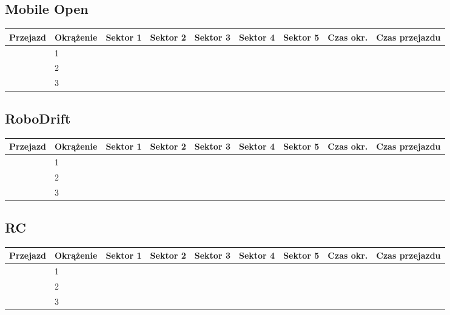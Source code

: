 \documentclass[11pt]{article}
\begin{document}
\subsection{Mobile Open}
\begin{table}[h]
\begin{tabular}{|l|l|l|l|l|l|l|l|l|}
\hline
   Przejazd        & Okrążenie & Sektor 1 & Sektor 2 & Sektor 3 & Sektor 4 & Sektor 5 & Czas okr. & Czas przejazdu    \\ \hline
\multirow{3}{*}{} & 1         &          &          &          &          &          &           & \multirow{3}{*}{} \\ \cline{2-8}
                   & 2         &          &          &          &          &          &           &                  \\ \cline{2-8}
                   & 3         &          &          &          &          &          &           &                   \\ \hline
\end{tabular}
\end{table}
\subsection{RoboDrift}
\begin{table}[h]
\begin{tabular}{|l|l|l|l|l|l|l|l|l|}
\hline
   Przejazd        & Okrążenie & Sektor 1 & Sektor 2 & Sektor 3 & Sektor 4 & Sektor 5 & Czas okr. & Czas przejazdu    \\ \hline
\multirow{3}{*}{} & 1         &          &          &          &          &          &           & \multirow{3}{*}{} \\ \cline{2-8}
                   & 2         &          &          &          &          &          &           &                  \\ \cline{2-8}
                   & 3         &          &          &          &          &          &           &                   \\ \hline
\end{tabular}
\end{table}
\subsection{RC}
\begin{table}[h]
\begin{tabular}{|l|l|l|l|l|l|l|l|l|}
\hline
   Przejazd        & Okrążenie & Sektor 1 & Sektor 2 & Sektor 3 & Sektor 4 & Sektor 5 & Czas okr. & Czas przejazdu    \\ \hline
\multirow{3}{*}{} & 1         &          &          &          &          &          &           & \multirow{3}{*}{} \\ \cline{2-8}
                   & 2         &          &          &          &          &          &           &                  \\ \cline{2-8}
                   & 3         &          &          &          &          &          &           &                   \\ \hline
\end{tabular}
\end{table}
\pagebreak
\end{document}
